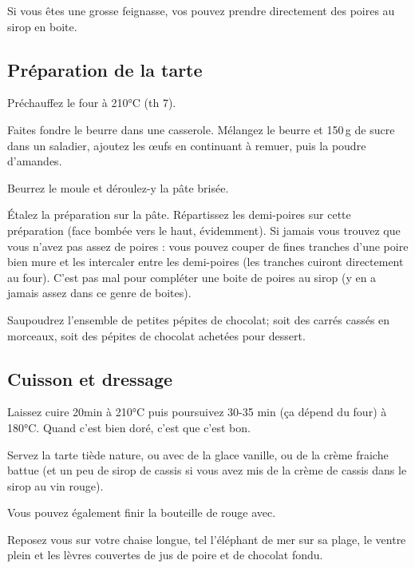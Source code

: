 	\begin{remarque}

		Si vous êtes une grosse feignasse, vos pouvez prendre directement des
		poires au sirop en boite.

	\end{remarque}

\subsection*{Préparation de la tarte}

\begin{instructions}
	
	\item Préchauffez le four à 210°C (th 7).
	\item Faites fondre le beurre dans une casserole. Mélangez le beurre et
	150\,g de sucre dans un saladier, ajoutez les œufs en continuant à remuer,
	puis la poudre d'amandes.
	\item Beurrez le moule et déroulez-y la pâte brisée.
	\item Étalez la préparation sur la pâte. Répartissez les demi-poires sur
	cette préparation (face bombée vers le haut, évidemment). Si jamais vous
	trouvez que vous n'avez pas assez de poires : vous pouvez couper de fines
	tranches d'une poire bien mure et les intercaler entre les demi-poires
	(les tranches cuiront directement au four). C'est pas mal pour compléter
	une boite de poires au sirop (y en a jamais assez dans ce genre de
	boites).
	\item Saupoudrez l'ensemble de petites pépites de chocolat; soit des
	carrés cassés en morceaux, soit des pépites de chocolat achetées pour
	dessert.

\end{instructions}

\subsection{Cuisson et dressage}

\begin{instructions}

	\item Laissez cuire 20min à 210°C puis poursuivez 30-35 min (ça dépend du
	four) à 180°C. Quand c'est bien doré, c'est que c'est bon.
	\item Servez la tarte tiède nature, ou avec de la glace vanille, ou de la
	crème fraiche battue (et un peu de sirop de cassis si vous avez mis de la
	crème de cassis dans le sirop au vin rouge).
	\item Vous pouvez également finir la bouteille de rouge avec.

\end{instructions}

Reposez vous sur votre chaise longue, tel l’éléphant de mer sur sa plage, le
ventre plein et les lèvres couvertes de jus de poire et de chocolat fondu.

